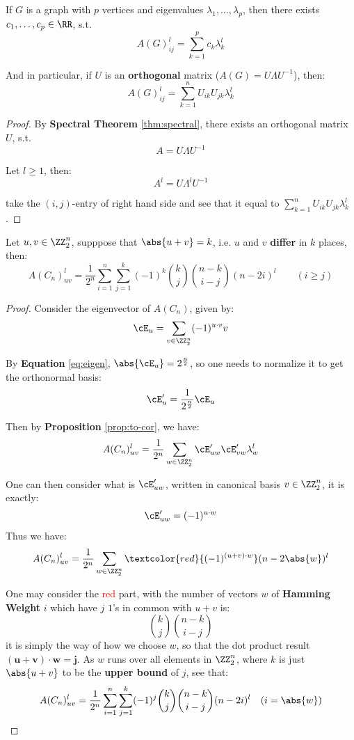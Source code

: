\begin{proposition}
	\label{prop:to-cor}
	If \( G \) is a graph with \( p \) vertices and eigenvalues \( \lambda_1, \ldots, \lambda_p \), then there exists \( c_1, \ldots, c_p \in \RR \), s.t.
	\[
		A(G)^l_{ij} = \sum_{k=1}^{p}c_k \lambda_k^l
	\]

	And in particular, if \( U \) is an \textbf{orthogonal} matrix (\( A(G) = U\Lambda U^{-1} \)), then:
	\[
		A(G)^l_{ij} = \sum_{k=1}^n U_{ik}U_{jk}\lambda_k^l
	\]
\end{proposition}

\begin{proof}
	By \textbf{Spectral Theorem} \ref{thm:spectral}, there exists an orthogonal matrix \( U \), s.t.
	\[
		A = U\Lambda U^{-1}
	\]

	Let \( l \geq 1 \), then:
	\[
		A^l = U\Lambda^l U^{-1}
	\]

	take the \( (i,j) \)-entry of right hand side and see that it equal to \( \sum_{k=1}^n U_{ik}U_{jk}\lambda_k^l \).
\end{proof}

\begin{corollary}
	Let \( u,v\in \ZZ^n_2 \), supppose that \( \abs{u+v} = k \), i.e. \( u \) and \( v \) \textbf{differ} in \( k \) places, then:
	\[
		A(C_n)^l_{uv} = \frac{1}{2^n} \sum_{i=1}^n \sum_{j=1}^k (-1)^k \binom{k}{j} \binom{n-k}{i-j}(n-2i)^l \qquad (i\geq j)
	\]
\end{corollary}

\begin{proof}
	Consider the eigenvector of \( A(C_n) \), given by:
	\[
		\cE_u = \sum_{v\in \ZZ_2^n}(-1)^{u\cdot v} v
	\]

	By \textbf{Equation} \ref{eq:eigen}, \( \abs{\cE_u} = 2^{\frac{n}{2}} \), so one needs to normalize it to get the orthonormal basis:
	\[
		\cE'_u = \frac{1}{2^{\frac{n}{2}}} \cE_u
	\]

	Then by \textbf{Proposition} \ref{prop:to-cor}, we have:
	\[
		A(C_n)^l_{uv} = \frac{1}{2^n}\sum_{w\in \ZZ^n_2} \cE'_{uw}\cE'_{vw} \lambda_{w}^l
	\]

	One can then consider what is \( \cE'_{uw} \), written in canonical basis \( v\in \ZZ^n_2 \), it is exactly:
	\[
		\cE'_{uw} = (-1)^{u\cdot w}
	\]
	Thus we have:
	\[
		A(C_n)^l_{uv} = \frac{1}{2^n}\sum_{w\in \ZZ^n_2} \textcolor{red}{(-1)^{(u+v)\cdot w}} (n-2\abs{w})^l
	\]

	One may consider the \textcolor{red}{red} part, with the number of vectors \( w \) of \textbf{Hamming Weight} \( i \) which have \( j \) \( 1 \)'s in common with \( u+v \) is:
	\[
		\binom{k}{j}\binom{n-k}{i-j}
	\]
	it is simply the way of how we choose \( w \), so that the dot product result \( \mathbf{(u+v)\cdot w = j} \). As \( w \) runs over all elements in \( \ZZ^n_2 \), where \( k \) is just \( \abs{u+v} \) to be the \textbf{upper bound} of \( j \), see that:
	\[
		A(C_n)^l_{uv} = \frac{1}{2^n} \sum_{i=1}^n \sum_{j=1}^{k} (-1)^j \binom{k}{j} \binom{n-k}{i-j} (n-2i)^{l} \quad (i = \abs{w})
	\]
\end{proof}

